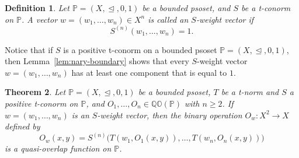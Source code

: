\documentclass[preprint,12pt]{elsarticle}
\newtheorem{theorem}{Theorem}[section]
\newtheorem{definition}[theorem]{Definition}
\begin{document}
\begin{definition}\label{def4.6}
\emph{Let $\mathbb{P}=(X,\trianglelefteq,0,1)$ be a bounded psoset, and $S$ be a t-conorm on $\mathbb{P}$. A vector $w=(w_1,\ldots,w_n)\in X^n$ is called an $S$-\emph{weight vector} if
$$
 S^{(n)}(w_1,\ldots,w_n)=1.
$$}
\end{definition}

Notice that if $S$ is a positive t-conorm on a bounded psoset
$\mathbb{P}=(X,\trianglelefteq,0,1)$, then Lemma~\ref{lem:nary-boundary} shows that
every $S$-weight vector $w=(w_1,\ldots,w_n)$ has at least one
component that is equal to $1$.

\begin{theorem}\label{thm:weighted}
Let $\mathbb{P}=(X,\trianglelefteq,0,1)$ be a bounded psoset, $T$ be a t-norm and $S$ a positive t-conorm on $\mathbb{P}$, and $O_1,\ldots,O_n\in\mathbb{QO}(\mathbb{P})$ with $n\geq2$. If $w=(w_1,\ldots,w_n)$ is an $S$-weight vector, then the binary operation $O_w:X^2\to X$ defined by
$$
 O_w(x,y)=S^{(n)}\bigl(T(w_1,O_1(x,y)),\ldots,T(w_n,O_n(x,y))\bigr)
$$
is a quasi-overlap function on $\mathbb{P}$.
\end{theorem}
\end{document}
